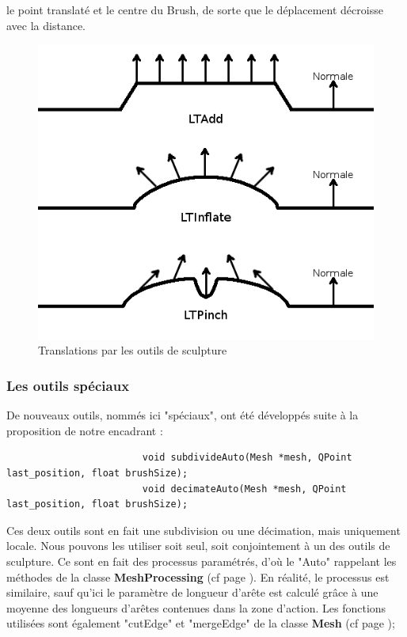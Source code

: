 \documentclass[a4paper]{memoir}
\begin{document}
					le point translaté et le centre du Brush, de sorte que le déplacement décroisse avec la distance.
					\begin{figure}[H]
						\begin{center}
							\includegraphics[scale=0.5]{img/tool-dev.png}
							\caption{Translations par les outils de sculpture}
						\end{center}
					\end{figure}
					
				\subsubsection{Les outils spéciaux}
					De nouveaux outils, nommés ici "spéciaux", ont été développés suite à la proposition de notre encadrant :
					\begin{verbatim}
						void subdivideAuto(Mesh *mesh, QPoint last_position, float brushSize);
						void decimateAuto(Mesh *mesh, QPoint last_position, float brushSize);
					\end{verbatim}
					Ces deux outils sont en fait une subdivision ou une décimation, mais uniquement locale. Nous pouvons les utiliser soit seul, soit 
					conjointement à un des outils de sculpture. Ce sont en fait des processus paramétrés, d'où le "Auto" rappelant les méthodes de la classe 
					\textbf{MeshProcessing} (cf page \pageref{processing-dev}). En réalité, le processus est similaire, sauf qu'ici le paramètre de longueur 
					d'arête est calculé grâce à une moyenne des longueurs d'arêtes contenues dans la zone d'action. Les fonctions utilisées sont également 
					"cutEdge" et "mergeEdge" de la classe \textbf{Mesh} (cf page \pageref{mesh-dev});
				
\end{document}

